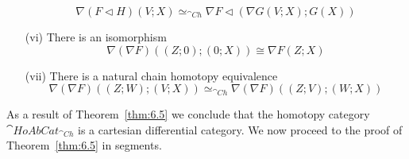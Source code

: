 \begin{thm}[label=thm:6.5]
\begin{itemize}
            \begin{equation*}
                \nabla (F\lhd H)(V;X)\simeq_{\cat{Ch}}\nabla F \lhd (\nabla G(V;X);G(X))
            \end{equation*}
        \item[(vi)] There is an isomorphism 
            \begin{equation*}
                \nabla (\nabla F)((Z;0);(0;X)) \cong \nabla F(Z;X)
            \end{equation*}
        \item[(vii)] There is a natural chain homotopy equivalence 
            \begin{equation*}
                \nabla (\nabla F)((Z;W);(V;X)) \simeq_{\cat{Ch}} \nabla (\nabla F)((Z;V);(W;X))
            \end{equation*}
    \end{itemize}
\end{thm}

As a result of Theorem~\ref{thm:6.5} we conclude that the homotopy category $\cat{HoAbCat}_{\cat{Ch}}$ is a cartesian differential category. We now proceed to the proof of Theorem~\ref{thm:6.5} in segments.

